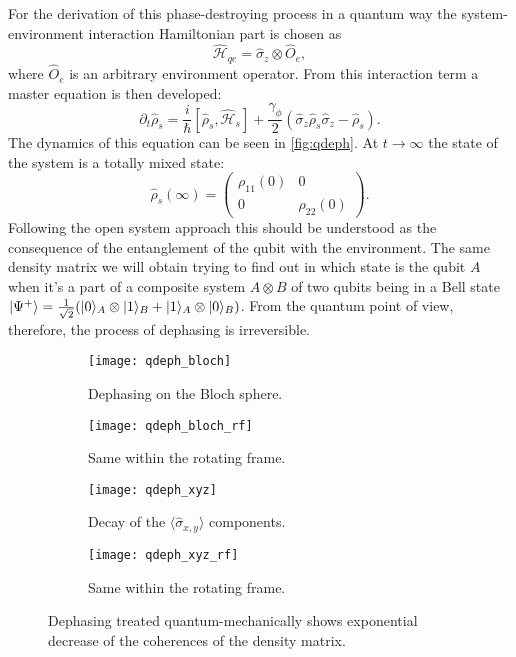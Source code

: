 \documentclass[12pt, twoside]{report}
\DeclarePairedDelimiter\ket{\lvert}{\rangle}
\newcommand{\rbrkt}[1]{\left( #1 \right)}
\numberwithin{equation}{section}
\begin{document}
For the derivation of this phase-destroying process in a quantum way the system-environment interaction Hamiltonian part is chosen as
\[
\mathcal{\hat H}_{qe} = \hat \sigma_z \otimes \hat O_e, 
\]
where $\hat O_e$ is an arbitrary environment operator. From this interaction term a master equation is then developed:
\[
\partial_t \hat \rho_s = \frac{i}{\hbar}[\hat \rho_s, \mathcal{\hat H}_s] + \frac{\gamma_\phi}{2} (\hat \sigma_z \hat \rho_s \hat \sigma_z - \hat \rho_s).
\]
The dynamics of this equation can be seen in \autoref{fig:qdeph}.  At $t \rightarrow \infty$ the state of the system is a totally mixed state:
\[
\hat \rho_s (\infty) = \rbrkt{\begin{matrix}
\rho_{11}(0) & 0 \\
0 & \rho_{22}(0) 
\end{matrix}}.
\]
Following the open system approach this should be understood as the consequence of the entanglement of the qubit with the environment. The same density matrix we will obtain trying to find out in which state
is the qubit $A$ when it's a part of a composite system $A \otimes B$ of two qubits being in a Bell  state $\ket{\Psi^+} = \frac{1}{\sqrt{2}}(\ket{0}_A\otimes\ket{1}_B+\ket{1}_A\otimes\ket{0}_B)$. From the quantum point of view, therefore, the process of dephasing is irreversible.
\begin{figure}
\centering
\begin{subfigure}[t]{0.45\textwidth}
\centering
\texttt{[image: qdeph\_bloch]}
\caption{Dephasing on the Bloch sphere.}
\end{subfigure}
\begin{subfigure}[t]{0.45\textwidth}
\centering
\texttt{[image: qdeph\_bloch\_rf]}
\caption{Same within the rotating frame.}
\end{subfigure}

\begin{subfigure}[t]{0.45\textwidth}
\centering
\texttt{[image: qdeph\_xyz]}
\caption{Decay of the $\langle \hat \sigma_{x, y} \rangle$ components.}
\end{subfigure}
\begin{subfigure}[t]{0.45\textwidth}
\centering
\texttt{[image: qdeph\_xyz\_rf]}
\caption{Same within the rotating frame.}
\end{subfigure}
\caption{Dephasing treated quantum-mechanically shows exponential decrease of the coherences of the density matrix.}
\label{fig:qdeph}
\end{figure}
\end{document}
